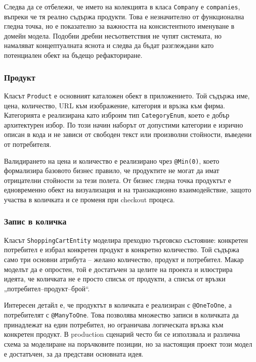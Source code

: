 Следва да се отбележи, че името на колекцията в класа \texttt{Company} е \texttt{companies}, въпреки че тя реално съдържа продукти. Това е незначително от функционална гледна точка, но е показателно за важността на консистентното именуване в домейн модела. Подобни дребни несъответствия не чупят системата, но намаляват концептуалната яснота и следва да бъдат разглеждани като потенциален обект на бъдещо рефакториране.

\subsubsection{Продукт}

Класът \texttt{Product} е основният каталожен обект в приложението. Той съдържа име, цена, количество, URL към изображение, категория и връзка към фирма. Категорията е реализирана като изброим тип \texttt{CategoryEnum}, което е добър архитектурен избор. По този начин наборът от допустими категории е изрично описан в кода и не зависи от свободен текст или произволни стойности, въведени от потребителя.

Валидирането на цена и количество е реализирано чрез \texttt{@Min(0)}, което формализира базовото бизнес правило, че продуктите не могат да имат отрицателни стойности за тези полета. От бизнес гледна точка продуктът е едновременно обект на визуализация и на транзакционно взаимодействие, защото участва в количката и се променя при checkout процеса.

\subsubsection{Запис в количка}

Класът \texttt{ShoppingCartEntity} моделира преходно търговско състояние: конкретен потребител е избрал конкретен продукт в конкретно количество. Той съдържа само три основни атрибута -- желано количество, продукт и потребител. Макар моделът да е опростен, той е достатъчен за целите на проекта и илюстрира идеята, че количката не е просто списък от продукти, а списък от връзки „потребител--продукт--брой“.

Интересен детайл е, че продуктът в количката е реализиран с \texttt{@OneToOne}, а потребителят с \texttt{@ManyToOne}. Това позволява множество записи в количката да принадлежат на един потребител, но ограничава логическата връзка към конкретен продукт. В production сценарий често би се използвала и различна схема за моделиране на поръчковите позиции, но за настоящия проект този модел е достатъчен, за да представи основната идея.

